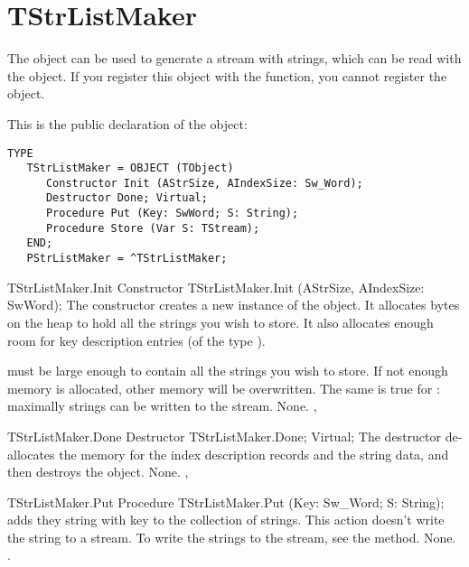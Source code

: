 \section{TStrListMaker}
\label{se:TStrListMaker}

The  object can be used to generate a stream with
strings, which can be read with the  object.
If you register this object with the 
function, you cannot register the  object.

This is the public declaration of the  object:
\begin{verbatim}
TYPE
   TStrListMaker = OBJECT (TObject)
      Constructor Init (AStrSize, AIndexSize: Sw_Word);
      Destructor Done; Virtual;
      Procedure Put (Key: SwWord; S: String);
      Procedure Store (Var S: TStream);
   END;
   PStrListMaker = ^TStrListMaker;
\end{verbatim}

\begin{procedure}{TStrListMaker.Init}
\Declaration
Constructor TStrListMaker.Init (AStrSize, AIndexSize: SwWord);
\Description
The  constructor creates a new instance of the 
object. It allocates  bytes on the heap to hold all the
strings you wish to store. It also allocates enough room for 
 key description entries (of the type ).

 must be large enough to contain all the strings you wish to
store. If not enough memory is allocated, other memory will be overwritten.
The same is true for  : maximally  strings
can be written to the stream.
\Errors
None.
\SeeAlso
{}, 
\end{procedure}

\begin{procedure}{TStrListMaker.Done}
\Declaration
Destructor TStrListMaker.Done; Virtual;
\Description
The  destructor de-allocates the memory for the index description
records and the string data, and then destroys the object. 
\Errors
None.
\SeeAlso
{}, 
\end{procedure}

\begin{procedure}{TStrListMaker.Put}
\Declaration
Procedure TStrListMaker.Put (Key: Sw\_Word; S: String);
\Description
{} adds they string  with key  to the collection of
strings. This action doesn't write the string to a stream. To write the
strings to the stream, see the  method.
\Errors
None.
\SeeAlso
{}.
\end{procedure}


